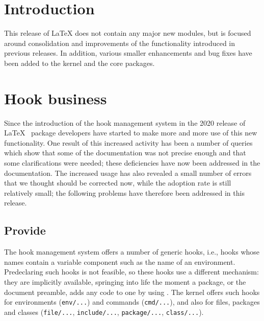 \documentclass{ltnews}
\providecommand\tubcommand[1]{}
\begin{document}
\tubcommand{\addtolength\textheight{4.2pc}}   %

\maketitle
{ \spaceskip=3.33pt  \tableofcontents}

\setlength{}


\medskip


\section{Introduction}


This release of \LaTeX{} does not contain any major new modules, but
is focused around consolidation and improvements of the functionality
introduced in previous releases.  In addition, various smaller
enhancements and bug fixes have been added to the kernel and the core
packages.


\section{Hook business}

Since the introduction of the hook management system in the 2020
release of \LaTeX{}~\cite{34:ltnews32} package 
developers have started
to make more and more use of this new functionality. One result 
of this increased activity has been a
number of queries which show that some of the documentation was not
precise enough and that some clarifications were needed; these 
deficiencies have now been addressed in the documentation. 
%
The increased usage has also revealed 
a small number of errors that we thought
should be corrected now, while the adoption rate is still relatively
small; the following problems have therefore been addressed in this release.


\subsection{Provide }

The hook management system offers a number of generic hooks, i.e.,
hooks whose names contain a variable component such as the name
of an environment. Predeclaring such hooks is not feasible, 
so these hooks use a different mechanism: they are
implicitly available, springing into life the moment a package, or 
the document preamble, adds any code to one by using .  
%
The kernel offers such hooks for environments
 (\texttt{env/...}) and commands (\texttt{cmd/...}), and also for files, 
 packages and classes (\texttt{file/...},
\texttt{include/...}, \texttt{package/...}, \texttt{class/...}).
\end{document}
